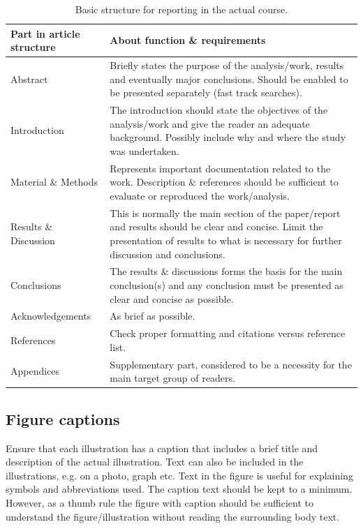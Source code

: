 \documentclass[a4paper,11pt]{extarticle}
\begin{document}
\begin{table}[H]
  \footnotesize
  \begin{tabulary}{\textwidth}{|l|L|}
    \hline
    Part in article structure & About function \& requirements \\\hline
    Abstract & Briefly states the purpose of the analysis/work, results and eventually major conclusions. Should be enabled to be presented separately (fast track searches). \\ \hline
    Introduction & The introduction should state the objectives of the analysis/work and give the reader an adequate background. Possibly include why and where the study was undertaken. \\ \hline
    Material \& Methods & Represents important documentation related to the work. Description \& references should be sufficient to evaluate or reproduced the work/analysis. \\ \hline
    Results \& Discussion  & This is normally the main section of the paper/report and results should be clear and concise. Limit the presentation of results to what is necessary for further discussion and conclusions. \\ \hline
    Conclusions  & The results \& discussions forms the basis for the main conclusion(s) and any conclusion must be presented as clear and concise as possible. \\ \hline
    Acknowledgements & As brief as possible. \\ \hline
    References & Check proper formatting and citations versus reference list. \\ \hline
    Appendices & Supplementary part, considered to be a necessity for the main target group of readers. \\\hline
  \end{tabulary}
  \caption{Basic structure for reporting in the actual course.}
  \label{tab:ReportStructure}
\end{table}

\subsection{Figure captions}
Ensure that each illustration has a caption that includes a brief title and description of the actual illustration. Text can also be included in the illustrations, e.g. on a photo, graph etc. Text in the figure is useful for explaining symbols and abbreviations used. The caption text should be kept to a minimum. However, as a thumb rule the figure with caption should be sufficient to understand the figure/illustration without reading the surrounding body text.
\end{document}
